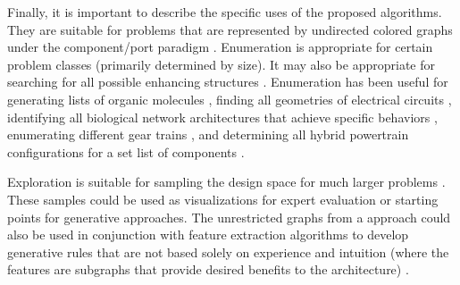 Finally, it is important to describe the specific uses of the proposed algorithms. They are suitable for problems that are represented by undirected colored graphs under the component/port paradigm \cite{Mittal1989a, Snavely1993a, Munzer2013a}.
Enumeration is appropriate for certain problem classes (primarily determined by size). It may also be appropriate for searching for all possible enhancing structures \cite{Munzer2013a}. Enumeration has been useful for generating lists of organic molecules \cite{Carhart1975a, Faulon2003b, Ruddigkeit2012a}, finding all geometries of electrical circuits \cite{Foster1932a}, identifying all biological network architectures that achieve specific behaviors \cite{Ma2009a}, enumerating different gear trains \cite{Pennestri2015a, Castillo2002a}, and determining all hybrid powertrain configurations for a set list of components \cite{Bayrak2016a}.

Exploration is suitable for sampling the design space for much larger problems \cite{Wyatt2014a}. These samples could be used as visualizations for expert evaluation or starting points for generative approaches. The unrestricted graphs from a \mypm{} approach could also be used in conjunction with feature extraction algorithms to develop generative rules that are not based solely on experience and intuition (where the features are subgraphs that provide desired benefits to the architecture) \cite{Berlingerio2009a}.